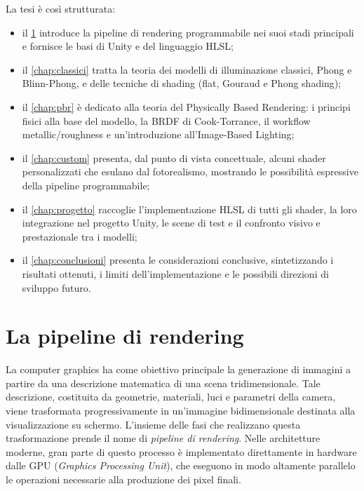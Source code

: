 \documentclass[12pt,a4paper,twoside]{book}
\begin{document}
La tesi è così strutturata:
\begin{itemize}
    \item il \cref{chap:pipeline} introduce la pipeline di rendering programmabile nei suoi stadi principali e fornisce le basi di Unity e del linguaggio HLSL;
    \item il \cref{chap:classici} tratta la teoria dei modelli di illuminazione classici, Phong e Blinn-Phong, e delle tecniche di shading (flat, Gouraud e Phong shading);
    \item il \cref{chap:pbr} è dedicato alla teoria del Physically Based Rendering: i principi fisici alla base del modello, la BRDF di Cook-Torrance, il workflow metallic/roughness e un'introduzione all'Image-Based Lighting;
    \item il \cref{chap:custom} presenta, dal punto di vista concettuale, alcuni shader personalizzati che esulano dal fotorealismo, mostrando le possibilità espressive della pipeline
    programmabile;
    \item il \cref{chap:progetto} raccoglie l'implementazione HLSL di tutti gli shader, la loro integrazione nel progetto Unity, le scene di test e il confronto visivo e prestazionale tra i modelli;
    \item il \cref{chap:conclusioni} presenta le considerazioni conclusive, sintetizzando i risultati ottenuti, i limiti dell'implementazione e le possibili direzioni di sviluppo futuro.
\end{itemize}


\chapter{La pipeline di rendering} \label{chap:pipeline}

La computer graphics ha come obiettivo principale la generazione di immagini a partire da una descrizione matematica di una scena tridimensionale. Tale descrizione, costituita da geometrie, materiali, luci e parametri della camera, viene trasformata progressivamente in un'immagine bidimensionale destinata alla visualizzazione su schermo. L'insieme delle fasi che realizzano questa trasformazione prende il nome di \textit{pipeline di rendering}. Nelle architetture moderne, gran parte di questo processo è implementato direttamente in hardware dalle GPU (\textit{Graphics Processing Unit}), che eseguono in modo altamente parallelo le operazioni necessarie alla produzione dei pixel finali.
\end{document}
